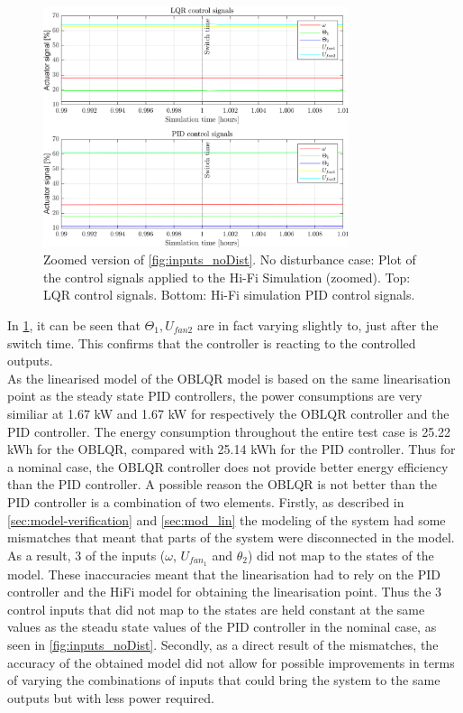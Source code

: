 \begin{figure}[H]
	\centering
	\includegraphics[width=0.8\textwidth]{Graphics/fig_inputs_noDist_zoom.png}
	\caption{Zoomed version of \cref{fig:inputs_noDist}. No disturbance case: Plot of the control signals applied to the Hi-Fi Simulation (zoomed). Top: LQR control signals. Bottom: Hi-Fi simulation PID control signals.}
	\label{fig:inputs_noDist_zoom}
\end{figure}
 
In \cref{fig:inputs_noDist_zoom}, it can be seen that $ \Theta_1, U_{fan2} $ are in fact varying slightly to, just after the switch time. This confirms that the controller is reacting to the controlled outputs. \\
\noindent As the linearised model of the OBLQR model is based on the same linearisation point as the steady state PID controllers, the power consumptions are very similiar at 1.67 \si{kW} and 1.67 \si{kW} for respectively the OBLQR controller and the PID controller. The energy consumption throughout the entire test case is 25.22 \si{kWh} for the OBLQR, compared with 25.14 \si{kWh} for the PID controller. Thus for a nominal case, the OBLQR controller does not provide better energy efficiency than the PID controller. A possible reason the OBLQR is not better than the PID controller is a combination of two elements. Firstly, as described in \cref{sec:model-verification} and \cref{sec:mod_lin} the modeling of the system had some mismatches that meant that parts of the system were disconnected in the model. As a result, 3 of the inputs ($\omega$, $U_{fan_1}$ and $\theta_2$) did not map to the states of the model. These inaccuracies meant that the linearisation had to rely on the PID controller and the HiFi model for obtaining the linearisation point. Thus the 3 control inputs that did not map to the states are held constant at the same values as the steadu state values of the PID controller in the nominal case, as seen in \cref{fig:inputs_noDist}. Secondly, as a direct result of the mismatches, the accuracy of the obtained model did not allow for possible improvements in terms of varying the combinations of inputs that could bring the system to the same outputs but with less power required. 


